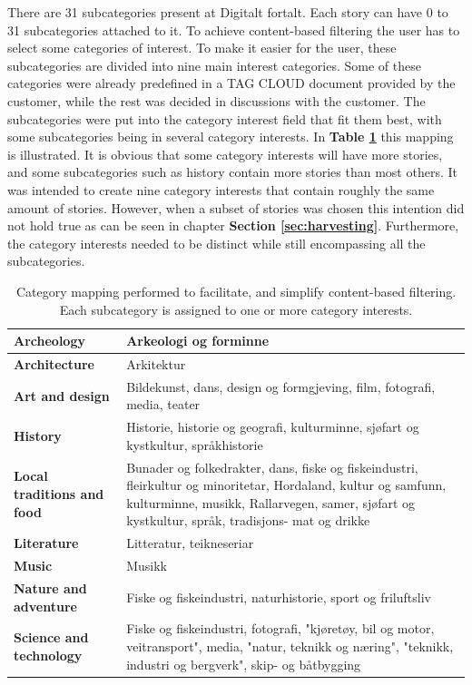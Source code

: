 There are 31 subcategories present at Digitalt fortalt. Each story can have 0 to 31 subcategories attached to it. To achieve content-based filtering the user has to select some categories of interest. To make it easier for the user, these subcategories are divided into nine main interest categories. Some of these categories were already predefined in a TAG CLOUD document provided by the customer, while the rest was decided in discussions with the customer. The subcategories were put into the category interest field that fit them best, with some subcategories being in several category interests. In \textbf{Table \ref{Tab:categorymapping}} this mapping is illustrated. It is obvious that some category interests will have more stories, and some subcategories such as history contain more stories than most others. It was intended to create nine category interests that contain roughly the same amount of stories. However, when a subset of stories was chosen this intention did not hold true as can be seen in chapter \textbf{Section \ref{sec:harvesting}}. Furthermore, the category interests needed to be distinct while still encompassing all the subcategories. 

\begin{table}[!h]
	\begin{center}
		\caption{Category mapping performed to facilitate, and simplify content-based filtering. Each subcategory is assigned to one or more category interests.}
		\label{Tab:categorymapping}
		\begin{tabular}{ | p{5cm} | p{12cm}|}
			\hline
			\textbf{Archeology} & Arkeologi og forminne \\ \hline
			\textbf{Architecture} & Arkitektur \\ \hline
			\textbf{Art and design} & Bildekunst, dans, design og formgjeving, film, fotografi, media, teater \\ \hline
			\textbf{History} & Historie, historie og geografi, kulturminne, sjøfart og kystkultur, språkhistorie \\ \hline
			\textbf{Local traditions and food} & Bunader og folkedrakter, dans, fiske og fiskeindustri, fleirkultur og minoritetar, Hordaland, kultur og samfunn, kulturminne, musikk, Rallarvegen, samer, sjøfart og kystkultur, språk, tradisjons- mat og drikke \\ \hline
			\textbf{Literature } & Litteratur, teikneseriar \\ \hline
			\textbf{Music} & Musikk \\ \hline
			\textbf{Nature and adventure} & Fiske og fiskeindustri, naturhistorie, sport og friluftsliv \\ \hline
			\textbf{Science and technology} & Fiske og fiskeindustri, fotografi, "kjøretøy, bil og motor, veitransport", media, "natur, teknikk og næring", "teknikk, industri og bergverk", skip- og båtbygging \\ \hline
		\end{tabular}
	\end{center}
\end{table}


